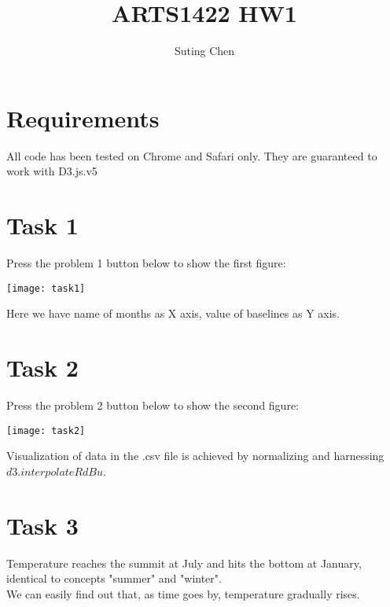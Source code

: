 \documentclass[]{article}
\title{ARTS1422 HW1}
\author{Suting Chen}
\begin{document}
\maketitle

\section{Requirements}
All code has been tested on Chrome and Safari only. They are guaranteed to work with D3.js.v5

\section{Task 1}
Press the problem 1 button below to show the first figure: 
\begin{center}
\texttt{[image: task1]}
\end{center}
Here we have name of months as X axis, value of baselines as Y axis.

\newpage

\section{Task 2}
Press the problem 2 button below to show the second figure: 
\begin{center}
	\texttt{[image: task2]}
\end{center}
Visualization of data in the .csv file is achieved by normalizing and harnessing $d3.interpolateRdBu$.


\section{Task 3}
Temperature reaches the summit at July and hits the bottom at January, identical to concepts "summer" and "winter".
\\
We can easily find out that, as time goes by, temperature gradually rises.
\end{document}
